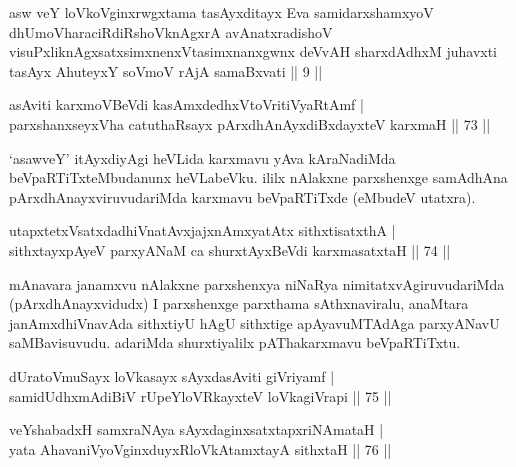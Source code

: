 \begin{shl}
asw veY loVkoV\s ginxrwgxtama tasAyxditayx Eva samidarxshamxyoV dhUmoV\s haraciRdiRshoV\s knAgxrA avAnatxradishoV visuPxliknAgxsatxsimxnenxVtasimxnanxgwnx deVvAH sharxdAdhxM juhavxti tasAyx AhuteyxY soVmoV rAjA samaBxvati || 9 ||
\end{shl}


\begin{shl}
asAviti karxmoV\s BeVdi kasAmxdedhxVtoVritiVyaRtAmf | \\
parxshanxseyxVha catuthaRsayx pArxdhAnAyxdiBxdayxteV karxmaH \hfill|| 73 || 
\end{shl}

\begin{artha}
`asawveY' itAyxdiyAgi heVLida karxmavu yAva kAraNadiMda beVpaRTiTx\-teMbudanunx heVLabeVku. ililx nAlakxne parxshenxge samAdhAna pArxdhAnayxviruvudariMda karxmavu beVpaRTiTxde (eMbudeV utatxra).
\end{artha}


\begin{shl}
utapxtetxVsatxdadhiVnatAvxjajxnAmxyatAtx sithxtisatxthA | \\
sithxtayxpAyeV parxyANaM ca shurxtAyx\s BeVdi karxmasatxtaH \hfill|| 74 || 
\end{shl}

\begin{artha}
mAnavara janamxvu nAlakxne parxshenxya niNaRya nimitatxvAgiruvudariMda (pArxdhAnayxvidudx) I parxshenxge parxthama sAthxnaviralu, anaMtara janAmxdhiVnavAda sithxtiyU hAgU sithxtige apAyavuMTAdAga parxyANavU saMBavisuvudu. adariMda shurxtiyalilx pAThakarxmavu beVpaRTiTxtu.
\end{artha}


\begin{shl}
dUratoV\s muSayx loVkasayx sAyxdasAviti giVriyamf | \\
samidUdhxmAdiBiV rUpeYloVRkayxteV loVkagiVrapi \hfill|| 75 || 
\end{shl}

\begin{shl}
veYshabadxH samxraNAya sAyxdaginxsatxtapxriNAmataH | \\
yata AhavaniVyoV\s ginxduyxRloVkAtamxtayA sithxtaH \hfill|| 76 || 
\end{shl}

